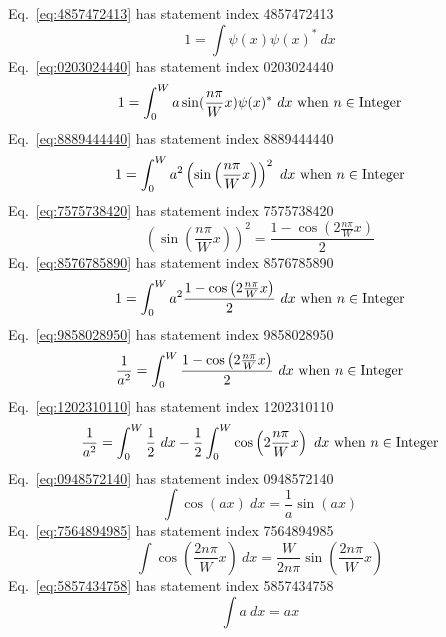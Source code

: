 \documentclass[12pt]{report}
\newcommand{\when}[1]{{\rm \ when\ }#1}
\begin{document}
Eq.~\ref{eq:4857472413} has statement index 4857472413
\begin{equation}
1= \int \psi(x)\psi(x)^*\ dx
\label{eq:4857472413}
\end{equation}
Eq.~\ref{eq:0203024440} has statement index 0203024440
\begin{equation}
1= \int_0^W a \sin(\frac{n \pi}{W} x) \psi(x)^*\ dx\when{n \in {\rm Integer}}
\label{eq:0203024440}
\end{equation}
Eq.~\ref{eq:8889444440} has statement index 8889444440
\begin{equation}
1= \int_0^W a^2 \left(\sin\left(\frac{n \pi}{W} x\right)\right)^2\ dx\when{n \in {\rm Integer}}
\label{eq:8889444440}
\end{equation}
Eq.~\ref{eq:7575738420} has statement index 7575738420
\begin{equation}
\left(\sin\left(\frac{n \pi}{W}x\right)\right)^2 = \frac{1-\cos\left(2\frac{n \pi}{W}x\right)}{2}
\label{eq:7575738420}
\end{equation}
Eq.~\ref{eq:8576785890} has statement index 8576785890
\begin{equation}
1= \int_0^W a^2 \frac{1-\cos\left(2\frac{n \pi}{W}x\right)}{2}\ dx\when{n \in {\rm Integer}}
\label{eq:8576785890}
\end{equation}
Eq.~\ref{eq:9858028950} has statement index 9858028950
\begin{equation}
\frac{1}{a^2}= \int_0^W \frac{1-\cos\left(2\frac{n \pi}{W}x\right)}{2}\ dx\when{n \in {\rm Integer}}
\label{eq:9858028950}
\end{equation}
Eq.~\ref{eq:1202310110} has statement index 1202310110
\begin{equation}
\frac{1}{a^2}= \int_0^W \frac{1}{2}\ dx - \frac{1}{2} \int_0^W \cos\left(2\frac{n \pi}{W}x\right)\ dx\when{n \in {\rm Integer}}
\label{eq:1202310110}
\end{equation}
Eq.~\ref{eq:0948572140} has statement index 0948572140
\begin{equation}
\int \cos(a x)\ dx = \frac{1}{a}\sin(a x)
\label{eq:0948572140}
\end{equation}
Eq.~\ref{eq:7564894985} has statement index 7564894985
\begin{equation}
\int \cos\left(\frac{2n\pi}{W} x\right)\ dx = \frac{W}{2n\pi}\sin\left(\frac{2n\pi}{W} x\right)
\label{eq:7564894985}
\end{equation}
Eq.~\ref{eq:5857434758} has statement index 5857434758
\begin{equation}
\int a\ dx = a x
\label{eq:5857434758}
\end{equation}
\end{document}
